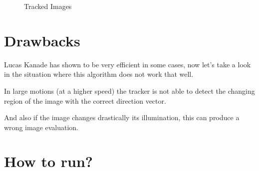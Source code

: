 \documentclass{article}
\begin{document}
\begin{figure}[H]
\centering
{}
		  \hspace{0.1cm}
		  \hspace{0.1cm}
\caption{Tracked Images}
\label{fig:tracked}
\end{figure}	


\section{Drawbacks}

Lucas Kanade has shown to be very efficient in some cases, now let's take a look in the situation where this algorithm does not work that well.

In large motions (at a higher speed) the tracker is not able to detect the changing region of the image with the correct direction vector.

And also if the image changes drastically its illumination, this can produce a wrong image evaluation.


\section{How to run?}
\end{document}
